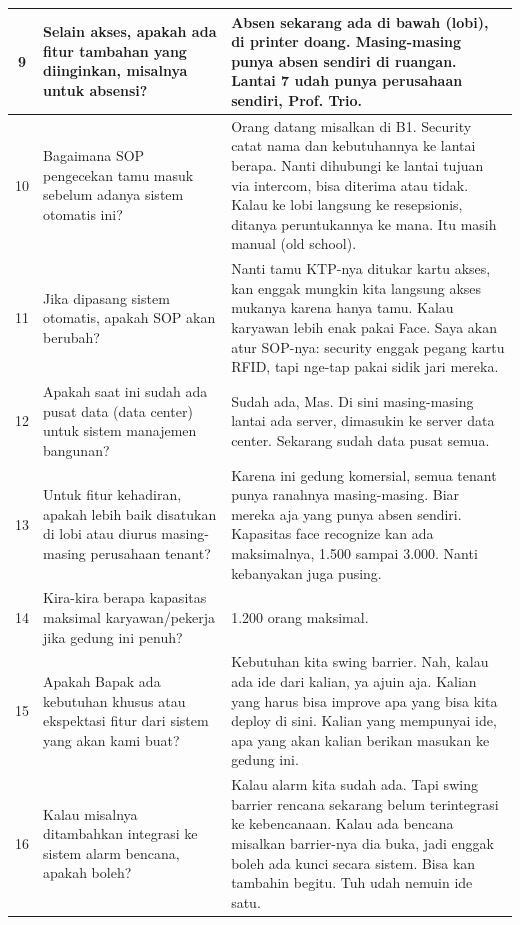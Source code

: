\begin{longtable}{|c|p{}|p{}|}
9 & Selain akses, apakah ada fitur tambahan yang diinginkan, misalnya untuk absensi? & Absen sekarang ada di bawah (lobi), di printer doang. Masing-masing punya absen sendiri di ruangan. Lantai 7 udah punya perusahaan sendiri, Prof. Trio. \\ \hline
10 & Bagaimana SOP pengecekan tamu masuk sebelum adanya sistem otomatis ini? & Orang datang misalkan di B1. Security catat nama dan kebutuhannya ke lantai berapa. Nanti dihubungi ke lantai tujuan via intercom, bisa diterima atau tidak. Kalau ke lobi langsung ke resepsionis, ditanya peruntukannya ke mana. Itu masih manual (old school). \\ \hline
11 & Jika dipasang sistem otomatis, apakah SOP akan berubah? & Nanti tamu KTP-nya ditukar kartu akses, kan enggak mungkin kita langsung akses mukanya karena hanya tamu. Kalau karyawan lebih enak pakai Face. Saya akan atur SOP-nya: security enggak pegang kartu RFID, tapi nge-tap pakai sidik jari mereka. \\ \hline
12 & Apakah saat ini sudah ada pusat data (data center) untuk sistem manajemen bangunan? & Sudah ada, Mas. Di sini masing-masing lantai ada server, dimasukin ke server data center. Sekarang sudah data pusat semua. \\ \hline
13 & Untuk fitur kehadiran, apakah lebih baik disatukan di lobi atau diurus masing-masing perusahaan tenant? & Karena ini gedung komersial, semua tenant punya ranahnya masing-masing. Biar mereka aja yang punya absen sendiri. Kapasitas face recognize kan ada maksimalnya, 1.500 sampai 3.000. Nanti kebanyakan juga pusing. \\ \hline
14 & Kira-kira berapa kapasitas maksimal karyawan/pekerja jika gedung ini penuh? & 1.200 orang maksimal. \\ \hline
15 & Apakah Bapak ada kebutuhan khusus atau ekspektasi fitur dari sistem yang akan kami buat? & Kebutuhan kita swing barrier. Nah, kalau ada ide dari kalian, ya ajuin aja. Kalian yang harus bisa improve apa yang bisa kita deploy di sini. Kalian yang mempunyai ide, apa yang akan kalian berikan masukan ke gedung ini. \\ \hline
16 & Kalau misalnya ditambahkan integrasi ke sistem alarm bencana, apakah boleh? & Kalau alarm kita sudah ada. Tapi swing barrier rencana sekarang belum terintegrasi ke kebencanaan. Kalau ada bencana misalkan barrier-nya dia buka, jadi enggak boleh ada kunci secara sistem. Bisa kan tambahin begitu. Tuh udah nemuin ide satu. \\ \hline
\end{longtable}
